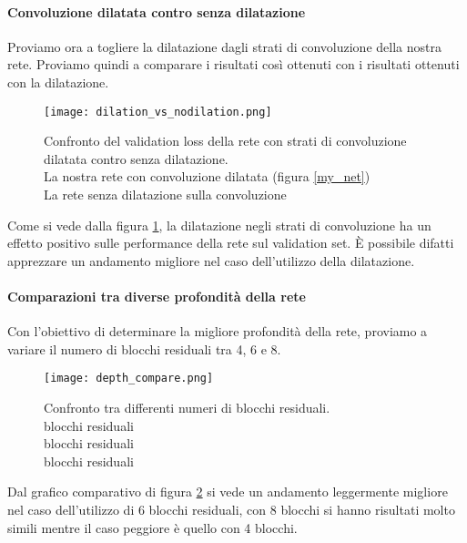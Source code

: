 \paragraph{Convoluzione dilatata contro senza dilatazione} Proviamo ora a togliere la dilatazione dagli strati di convoluzione della nostra rete. Proviamo quindi a comparare i risultati così ottenuti con i risultati ottenuti con la dilatazione.
\begin{figure}[H]
    \centering
    \texttt{[image: dilation\_vs\_nodilation.png]}
    \caption[Confronto del validation loss della rete con strati di convoluzione dilatata contro senza dilatazione]{
        Confronto del validation loss della rete con strati di convoluzione dilatata contro senza dilatazione. \\
        \quad La nostra rete con convoluzione dilatata (figura \ref{my_net})\\
        \quad La rete senza dilatazione sulla convoluzione
    }
    \label{dilation_vs_nodilation}
\end{figure}
Come si vede dalla figura \ref{dilation_vs_nodilation}, la dilatazione negli strati di convoluzione ha un effetto positivo sulle performance della rete sul validation set. È possibile difatti apprezzare un andamento migliore nel caso dell'utilizzo della dilatazione.

\paragraph{Comparazioni tra diverse profondità della rete}
Con l'obiettivo di determinare la migliore profondità della rete, proviamo a variare il numero di blocchi residuali tra 4, 6 e 8. 
\begin{figure}[H]
    \centering
    \texttt{[image: depth\_compare.png]}
    \caption[Confronto tra differenti numeri di blocchi residuali]{
        Confronto tra differenti numeri di blocchi residuali. \\
         blocchi residuali\\
         blocchi residuali\\
         blocchi residuali
    }
    \label{depth_compare}
\end{figure}
Dal grafico comparativo di figura \ref{depth_compare} si vede un andamento leggermente migliore nel caso dell'utilizzo di 6 blocchi residuali, con 8 blocchi si hanno risultati molto simili mentre il caso peggiore è quello con 4 blocchi.